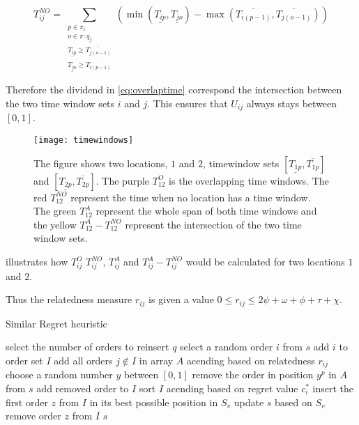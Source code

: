 \documentclass[../main.tex]{subfiles}
\begin{document}
\begin{equation}\label{eq:not}
    T^{NO}_{ij} = \sum\limits_{\substack{p\in \pi_i\\ o\in \pi:q_j\\ \underline{T_{ip}}\geq \overline{T_{j(o-1)}}\\ \underline{T_{jo}}\geq\overline{T_{i(p-1)}}}} 
    (\min(\underline{T_{ip}}, \underline{T_{jo}}) - \max(\overline{T_{i(p-1)}},\overline{T_{j(o-1)}}) ) 
\end{equation}

Therefore the dividend in \cref{eq:overlaptime} correspond the intersection between the two time window sets $i$ and $j$. This ensures that $U_{ij}$ always stays between $[0,1]$. \par
\begin{figure}                                                                                     
    \centering                                                                                 
    \texttt{[image: timewindows]} 
    \caption{The figure shows two locations, $1$ and $2$, timewindow sets $[\underline{T_{1p}},\overline{T_{1p}}]$ and $[\underline{T_{2p}},\overline{T_{2p}}]$. The purple $T^O_{12}$ is the overlapping time windows. The red $T^{NO}_{12}$ represent the time when no location has a time window. The green $T^A_{12}$ represent the whole span of both time windows and the yellow $T^A_{12} - T^{NO}_{12}$ represent the intersection of the two time window sets.}
    \label{fig:timewindow}
\end{figure}

 illustrates how $T^O_{ij}$ $T^{NO}_{ij}$, $T^A_{ij}$ and $T^A_{ij}-T^{NO}_{ij}$ would be calculated for two locations $1$ and $2$.

Thus the relatedness measure $r_{ij}$ is given a value $0\leq r_{ij} \leq 2\psi + \omega + \phi + \tau  + \chi$. \newline\par

\begin{algorithm}
    \caption{Similar Regret heuristic}\label{alg:simReg}
    \begin{algorithmic}[1]
        \State select the number of orders to reinsert $q$
        \State select a random order $i$ from $s$
        \State add $i$ to order set $I$
        \Repeat
            \State add all orders $j\not\in I$ in array $A$ acending based on relatedness $r_{ij}$
            \State choose a random number $y$ between $[0,1]$
            \State remove the order in position $y^p$ in $A$ from $s$ 
            \State add removed order to $I$
        \Repeat
            \State sort $I$ acending based on regret value $c^*_i$
            \State insert the first order $z$ from $I$ in its best possible position in $S_v$
            \State update $s$ based on $S_v$
            \State remove order $z$ from $I$
        \State
        \Return $s$
        \EndFunction
    \end{algorithmic}
\end{algorithm}
\end{document}
